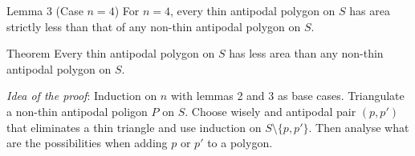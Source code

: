 \documentclass{beamer}
\begin{document}
\begin{frame}
\begin{alertblock}{Lemma 3 (Case $n=4$)}
For $n = 4$, every thin antipodal polygon on $S$ has area strictly less than
that of any non-thin antipodal polygon on $S$.
\end{alertblock}\pause

\begin{alertblock}{Theorem}
Every thin antipodal polygon on $S$ has less area than any non-thin antipodal
polygon on $S$.
\end{alertblock}\pause
\vspace{0.5cm}

\emph{Idea of the proof}: Induction on $n$ with lemmas 2 and 3 as base cases. Triangulate  a non-thin antipodal poligon $P$ on $S$. Choose wisely and antipodal pair $(p,p')$ that eliminates a thin triangle and use induction on $S\setminus\{p,p'\}$. Then analyse what are the possibilities when adding $p$ or $p'$ to a polygon.
\end{frame}
\end{document}
